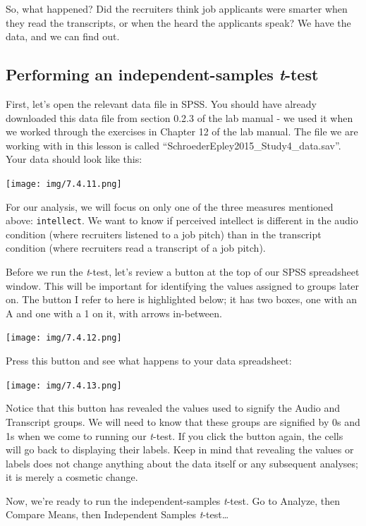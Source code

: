 \documentclass[
]{book}
\begin{document}
So, what happened? Did the recruiters think job applicants were smarter when they read the transcripts, or when the heard the applicants speak? We have the data, and we can find out.

\hypertarget{performing-an-independent-samples-t-test}{%
\subsection{\texorpdfstring{Performing an independent-samples \emph{t}-test}{Performing an independent-samples t-test}}\label{performing-an-independent-samples-t-test}}

First, let's open the relevant data file in SPSS. You should have already downloaded this data file from section 0.2.3 of the lab manual - we used it when we worked through the exercises in Chapter 12 of the lab manual. The file we are working with in this lesson is called ``SchroederEpley2015\_Study4\_data.sav''. Your data should look like this:

\texttt{[image: img/7.4.11.png]}

For our analysis, we will focus on only one of the three measures mentioned above: \texttt{intellect}. We want to know if perceived intellect is different in the audio condition (where recruiters listened to a job pitch) than in the transcript condition (where recruiters read a transcript of a job pitch).

Before we run the \emph{t}-test, let's review a button at the top of our SPSS spreadsheet window. This will be important for identifying the values assigned to groups later on. The button I refer to here is highlighted below; it has two boxes, one with an A and one with a 1 on it, with arrows in-between.

\texttt{[image: img/7.4.12.png]}

Press this button and see what happens to your data spreadsheet:

\texttt{[image: img/7.4.13.png]}

Notice that this button has revealed the values used to signify the Audio and Transcript groups. We will need to know that these groups are signified by 0s and 1s when we come to running our \emph{t}-test. If you click the button again, the cells will go back to displaying their labels. Keep in mind that revealing the values or labels does not change anything about the data itself or any subsequent analyses; it is merely a cosmetic change.

Now, we're ready to run the independent-samples \emph{t}-test. Go to {Analyze}, then {Compare Means}, then {Independent Samples \emph{t}-test\ldots{}}
\end{document}
